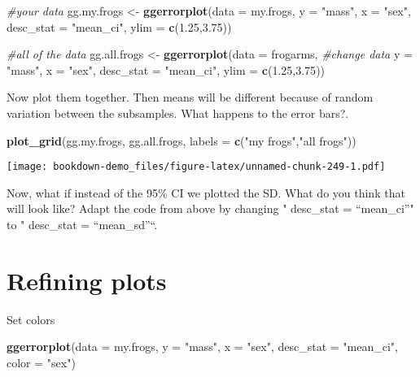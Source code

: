 \documentclass[]{book}
\newenvironment{Shaded}{\begin{snugshade}}{\end{snugshade}}
\newcommand{\KeywordTok}[1]{\textcolor[rgb]{0.13,0.29,0.53}{\textbf{#1}}}
\newcommand{\DataTypeTok}[1]{\textcolor[rgb]{0.13,0.29,0.53}{#1}}
\newcommand{\FloatTok}[1]{\textcolor[rgb]{0.00,0.00,0.81}{#1}}
\newcommand{\StringTok}[1]{\textcolor[rgb]{0.31,0.60,0.02}{#1}}
\newcommand{\CommentTok}[1]{\textcolor[rgb]{0.56,0.35,0.01}{\textit{#1}}}
\newcommand{\NormalTok}[1]{#1}
\theoremstyle{definition}
\theoremstyle{definition}
\theoremstyle{definition}
\theoremstyle{remark}
\begin{document}
\begin{Shaded}
\begin{Highlighting}[]
\CommentTok{#your data}
\NormalTok{gg.my.frogs <-}\StringTok{ }\KeywordTok{ggerrorplot}\NormalTok{(}\DataTypeTok{data =}\NormalTok{ my.frogs,}
          \DataTypeTok{y =} \StringTok{"mass"}\NormalTok{,}
          \DataTypeTok{x =} \StringTok{"sex"}\NormalTok{,}
          \DataTypeTok{desc_stat =} \StringTok{"mean_ci"}\NormalTok{,}
          \DataTypeTok{ylim =} \KeywordTok{c}\NormalTok{(}\FloatTok{1.25}\NormalTok{,}\FloatTok{3.75}\NormalTok{))}

\CommentTok{#all of the data}
\NormalTok{gg.all.frogs <-}\StringTok{ }\KeywordTok{ggerrorplot}\NormalTok{(}\DataTypeTok{data =}\NormalTok{ frogarms, }\CommentTok{#change data}
          \DataTypeTok{y =} \StringTok{"mass"}\NormalTok{,}
          \DataTypeTok{x =} \StringTok{"sex"}\NormalTok{,}
          \DataTypeTok{desc_stat =} \StringTok{"mean_ci"}\NormalTok{,}
          \DataTypeTok{ylim =} \KeywordTok{c}\NormalTok{(}\FloatTok{1.25}\NormalTok{,}\FloatTok{3.75}\NormalTok{))}
\end{Highlighting}
\end{Shaded}

Now plot them together. Then means will be different because of random
variation between the subsamples. What happens to the error bars?.

\begin{Shaded}
\begin{Highlighting}[]
\KeywordTok{plot_grid}\NormalTok{(gg.my.frogs, }
\NormalTok{          gg.all.frogs,}
          \DataTypeTok{labels =} \KeywordTok{c}\NormalTok{(}\StringTok{"my frogs"}\NormalTok{,}\StringTok{"all frogs"}\NormalTok{))}
\end{Highlighting}
\end{Shaded}

\texttt{[image: bookdown-demo\_files/figure-latex/unnamed-chunk-249-1.pdf]}

Now, what if instead of the 95\% CI we plotted the SD. What do you think
that will look like? Adapt the code from above by changing " desc\_stat
= ``mean\_ci''" to " desc\_stat = ``mean\_sd''``.

\section{Refining plots}\label{refining-plots}

Set colors

\begin{Shaded}
\begin{Highlighting}[]
\KeywordTok{ggerrorplot}\NormalTok{(}\DataTypeTok{data =}\NormalTok{ my.frogs,}
          \DataTypeTok{y =} \StringTok{"mass"}\NormalTok{,}
          \DataTypeTok{x =} \StringTok{"sex"}\NormalTok{,}
          \DataTypeTok{desc_stat =} \StringTok{"mean_ci"}\NormalTok{,}
          \DataTypeTok{color =} \StringTok{"sex"}\NormalTok{)}
\end{Highlighting}
\end{Shaded}
\end{document}
